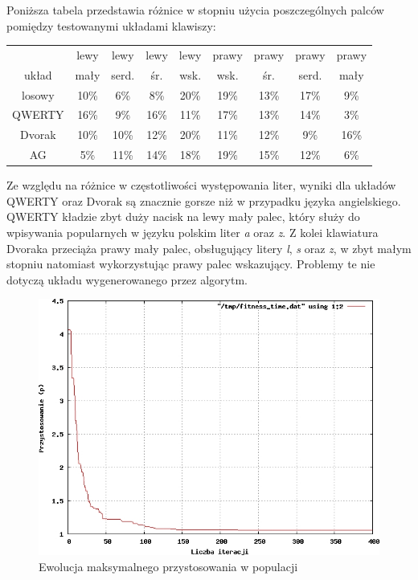 \documentclass[brudnopis]{xmgr}
\begin{document}
Poniższa tabela przedstawia różnice w stopniu użycia poszczególnych palców pomiędzy testowanymi układami klawiszy:\newline\newline
\begin{tabular}{ c | c | c | c | c | c | c | c | c}
                & lewy & lewy      & lewy     & lewy       & prawy      & prawy    & prawy     & prawy \\
  układ         & mały & serd. & śr. & wsk. & wsk. & śr. & serd. & mały \\
  \hline
  losowy        &  10\% & 6\% & 8\% & 20\% &   19\% & 13\% & 17\% & 9\% \\
  QWERTY        &  16\% & 9\% & 16\% & 11\% &  17\% & 13\% & 14\% & 3\% \\
  Dvorak        &  10\% & 10\% & 12\% & 20\% & 11\% & 12\% & 9\% & 16\% \\
  AG            &  5\% & 11\% & 14\% & 18\% &  19\% & 15\% & 12\% & 6\% \\
\end{tabular}\newline\newline

Ze względu na różnice w częstotliwości występowania liter, wyniki dla układów QWERTY oraz Dvorak są znacznie gorsze niż w przypadku języka angielskiego. QWERTY kładzie zbyt duży nacisk na lewy mały palec, który służy do wpisywania popularnych w języku polskim liter \emph{a} oraz \emph{z}. Z kolei klawiatura Dvoraka przeciąża prawy mały palec, obsługujący litery \emph{l}, \emph{s} oraz \emph{z}, w zbyt małym stopniu natomiast wykorzystując prawy palec wskazujący. Problemy te nie dotyczą układu wygenerowanego przez algorytm.

\begin{figure}[!tbh]
\centering
\includegraphics[width=.8\hsize]{fig/fitness_time_pl}
\caption{Ewolucja maksymalnego przystosowania w populacji}
\end{figure}
\end{document}
